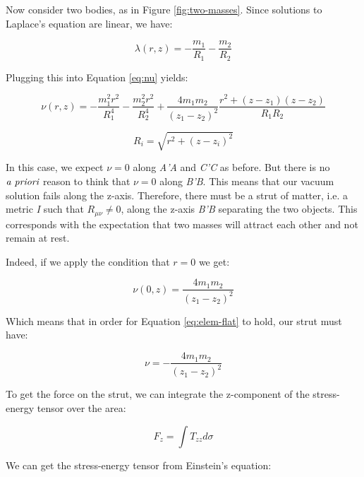 \documentclass{article}
\begin{document}
Now consider two bodies, as in Figure \ref{fig:two-masses}. Since solutions to Laplace's equation are linear, we have:

\begin{equation}
\lambda (r,z)=-\frac{m_{1}}{R_{1}}-\frac{m_{2}}{R_{2}}\label{eq:2-m}
\end{equation}

Plugging this into Equation \eqref{eq:nu} yields:

\begin{equation}
\nu (r,z)=-\frac{m_{1}^{2}r^{2}}{R_{1}^{4}}-\frac{m_{2}^{2}r^{2}}{R_{2}^{4}}+\frac{4m_{1}m_{2}}{\left(z_{1}-z_{2}\right)^{2}}\frac{r^{2}+\left(z-z_{1}\right)\left(z-z_{2}\right)}{R_{1}R_{2}}
\end{equation}

\begin{equation}
R_{i}=\sqrt{r^{2}+\left(z-z_{i}\right)^{2}}
\end{equation}

In this case, we expect $\nu=0$ along \emph{A'A} and \emph{C'C} as before. But there is no $\emph{a priori}$ reason to think that $\nu=0$ along \emph{B'B}.
This means that our vacuum solution fails along the z-axis. Therefore, there must be a strut of matter, i.e. a metric \emph{I} such that $R_{\mu\nu}\neq 0$, along the z-axis \emph{B'B} separating the two objects. This corresponds with the expectation that two masses will attract each other and not remain at rest.

Indeed, if we apply the condition that $r=0$ we get:

\begin{equation}
\nu (0,z)=\frac{4m_{1}m_{2}}{\left(z_{1}-z_{2}\right)^{2}}\label{eq:nu_r=0}
\end{equation}

Which means that in order for Equation \eqref{eq:elem-flat} to hold, our strut must have:

\begin{equation}
\nu=-\frac{4m_{1}m_{2}}{\left(z_{1}-z_{2}\right)^{2}}
\end{equation}

To get the force on the strut, we can integrate the z-component of the stress-energy tensor over the area:

\begin{equation}
F_{z}=\int T_{zz}d\sigma
\end{equation}

We can get the stress-energy tensor from Einstein's equation:
\end{document}
